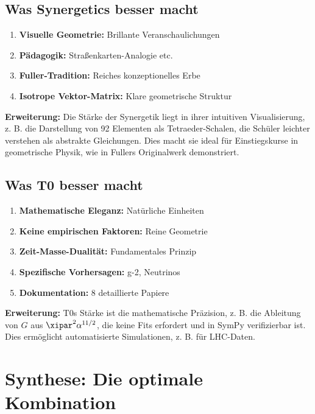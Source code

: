 	\subsection{Was Synergetics besser macht}
	
	\begin{enumerate}
		\item \textbf{Visuelle Geometrie:} Brillante Veranschaulichungen
		\item \textbf{Pädagogik:} Straßenkarten-Analogie etc.
		\item \textbf{Fuller-Tradition:} Reiches konzeptionelles Erbe
		\item \textbf{Isotrope Vektor-Matrix:} Klare geometrische Struktur
	\end{enumerate}
	
	\textbf{Erweiterung:} Die Stärke der Synergetik liegt in ihrer intuitiven Visualisierung, z. B. die Darstellung von 92 Elementen als Tetraeder-Schalen, die Schüler leichter verstehen als abstrakte Gleichungen. Dies macht sie ideal für Einstiegskurse in geometrische Physik, wie in Fullers Originalwerk demonstriert.
	
	\subsection{Was T0 besser macht}
	
	\begin{enumerate}
		\item \textbf{Mathematische Eleganz:} Natürliche Einheiten
		\item \textbf{Keine empirischen Faktoren:} Reine Geometrie
		\item \textbf{Zeit-Masse-Dualität:} Fundamentales Prinzip
		\item \textbf{Spezifische Vorhersagen:} g-2, Neutrinos
		\item \textbf{Dokumentation:} 8 detaillierte Papiere
	\end{enumerate}
	
	\textbf{Erweiterung:} T0s Stärke ist die mathematische Präzision, z. B. die Ableitung von $G$ aus $\xipar^2 \alpha^{11/2}$, die keine Fits erfordert und in SymPy verifizierbar ist. Dies ermöglicht automatisierte Simulationen, z. B. für LHC-Daten.
	
	\section{Synthese: Die optimale Kombination}
	
